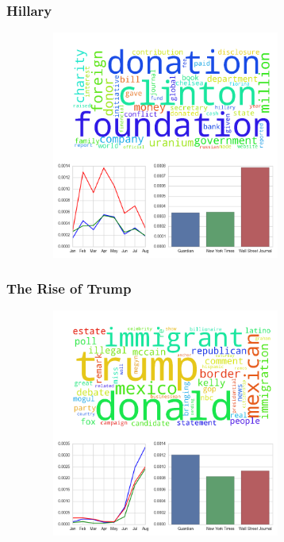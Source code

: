 \documentclass[11pt]{beamer}
\begin{document}

\begin{frame}
\frametitle{Hillary}

\begin{figure}
\centering
\includegraphics[width=85mm,height=75mm]{figures/source_topic10.png}
\end{figure} 

\end{frame}


\begin{frame}
\frametitle{The Rise of Trump}

\begin{figure}
\centering
\includegraphics[width=85mm,height=75mm]{figures/source_topic3.png}
\end{figure} 

\end{frame}
\end{document}
